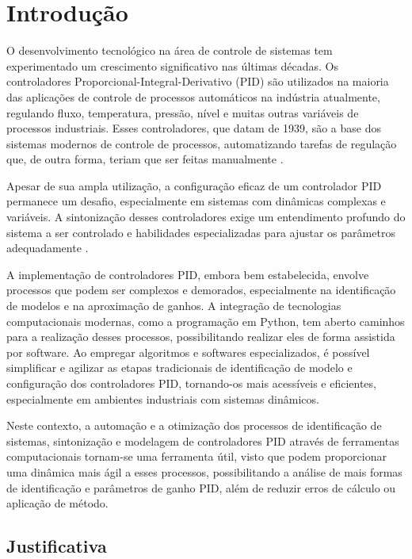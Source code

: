 \chapter{Introdução}


O desenvolvimento tecnológico na área de controle de sistemas tem experimentado um crescimento significativo nas
últimas décadas.
Os controladores Proporcional-Integral-Derivativo (PID) são utilizados na maioria das aplicações de controle de
processos automáticos na indústria atualmente, regulando fluxo, temperatura, pressão, nível e muitas outras variáveis
de processos industriais.
Esses controladores, que datam de 1939, são a base dos sistemas modernos de controle de processos, automatizando tarefas
de regulação que, de outra forma, teriam que ser feitas manualmente \cite{introart1}.

Apesar de sua ampla utilização, a configuração eficaz de um controlador PID permanece um desafio, especialmente em
sistemas com dinâmicas complexas e variáveis.
A sintonização desses controladores exige um entendimento profundo do sistema a ser controlado e habilidades
especializadas para ajustar os parâmetros adequadamente \cite{introart2}.

A implementação de controladores PID, embora bem estabelecida, envolve processos que podem ser complexos e demorados,
especialmente na identificação de modelos e na aproximação de ganhos.
A integração de tecnologias computacionais modernas, como a programação em Python, tem aberto caminhos para a
realização desses processos, possibilitando realizar eles de forma assistida por software.
Ao empregar algoritmos e softwares especializados, é possível simplificar e agilizar as etapas tradicionais de
identificação de modelo e configuração dos controladores PID, tornando-os mais acessíveis e eficientes, especialmente
em ambientes industriais com sistemas dinâmicos.

Neste contexto, a automação e a otimização dos processos de identificação de sistemas, sintonização e modelagem de
controladores PID através de ferramentas computacionais tornam-se uma ferramenta útil, visto que podem proporcionar
uma dinâmica mais ágil a esses processos, possibilitando a análise de mais formas de identificação e parâmetros de
ganho PID, além de reduzir erros de cálculo ou aplicação de método.

\section{Justificativa}


